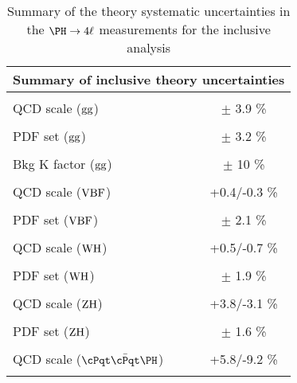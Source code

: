 \begin{table}[!htb]
\begin{center}
\small
\label{tab:SystOverviewTheo_bkg}
\caption{Summary of the theory systematic uncertainties in the $\Hllll$ measurements for the inclusive analysis}
\begin{tabular}{|lc|}
\hline %
\hline %
\multicolumn{2}{|c|}{\textbf{Summary of inclusive theory uncertainties}} \\
\hline %
\hline %
\vspace{-0.4cm} & \\
QCD scale (${\rm gg}$) & $\pm$ 3.9 \% \\
\vspace{-0.4cm} & \\
PDF set (${\rm gg}$) & $\pm$ 3.2 \% \\
\vspace{-0.4cm} & \\
Bkg K factor (${\rm gg}$) & $\pm$ 10 \% \\
\vspace{-0.4cm} & \\
QCD scale (${\rm VBF}$) & +0.4/-0.3 \% \\
\vspace{-0.4cm} & \\
PDF set (${\rm VBF}$) & $\pm$ 2.1 \% \\
\vspace{-0.4cm} & \\
QCD scale (${\rm WH}$) & +0.5/-0.7 \% \\
\vspace{-0.4cm} & \\
PDF set (${\rm WH}$) & $\pm$ 1.9 \% \\
\vspace{-0.4cm} & \\
QCD scale (${\rm ZH}$) & +3.8/-3.1 \% \\
\vspace{-0.4cm} & \\
PDF set (${\rm ZH}$) & $\pm$ 1.6 \% \\
\vspace{-0.4cm} & \\
QCD scale (${\rm \ttH}$) & +5.8/-9.2 \% \\
\vspace{-0.4cm} & \\

\end{tabular}
\end{center}
\end{table}
